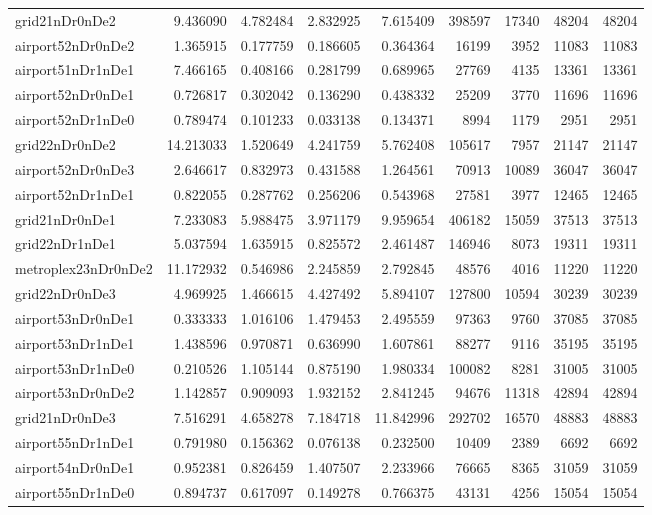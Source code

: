\begin{longtable}{|l|r|r|r|r|r|r|r|r|}
grid21nDr0nDe2 & 9.436090 & 4.782484 & 2.832925 & 7.615409 & 398597 & 17340 & 48204 & 48204 \\
airport52nDr0nDe2 & 1.365915 & 0.177759 & 0.186605 & 0.364364 & 16199 & 3952 & 11083 & 11083 \\
airport51nDr1nDe1 & 7.466165 & 0.408166 & 0.281799 & 0.689965 & 27769 & 4135 & 13361 & 13361 \\
airport52nDr0nDe1 & 0.726817 & 0.302042 & 0.136290 & 0.438332 & 25209 & 3770 & 11696 & 11696 \\
airport52nDr1nDe0 & 0.789474 & 0.101233 & 0.033138 & 0.134371 & 8994 & 1179 & 2951 & 2951 \\
grid22nDr0nDe2 & 14.213033 & 1.520649 & 4.241759 & 5.762408 & 105617 & 7957 & 21147 & 21147 \\
airport52nDr0nDe3 & 2.646617 & 0.832973 & 0.431588 & 1.264561 & 70913 & 10089 & 36047 & 36047 \\
airport52nDr1nDe1 & 0.822055 & 0.287762 & 0.256206 & 0.543968 & 27581 & 3977 & 12465 & 12465 \\
grid21nDr0nDe1 & 7.233083 & 5.988475 & 3.971179 & 9.959654 & 406182 & 15059 & 37513 & 37513 \\
grid22nDr1nDe1 & 5.037594 & 1.635915 & 0.825572 & 2.461487 & 146946 & 8073 & 19311 & 19311 \\
metroplex23nDr0nDe2 & 11.172932 & 0.546986 & 2.245859 & 2.792845 & 48576 & 4016 & 11220 & 11220 \\
grid22nDr0nDe3 & 4.969925 & 1.466615 & 4.427492 & 5.894107 & 127800 & 10594 & 30239 & 30239 \\
airport53nDr0nDe1 & 0.333333 & 1.016106 & 1.479453 & 2.495559 & 97363 & 9760 & 37085 & 37085 \\
airport53nDr1nDe1 & 1.438596 & 0.970871 & 0.636990 & 1.607861 & 88277 & 9116 & 35195 & 35195 \\
airport53nDr1nDe0 & 0.210526 & 1.105144 & 0.875190 & 1.980334 & 100082 & 8281 & 31005 & 31005 \\
airport53nDr0nDe2 & 1.142857 & 0.909093 & 1.932152 & 2.841245 & 94676 & 11318 & 42894 & 42894 \\
grid21nDr0nDe3 & 7.516291 & 4.658278 & 7.184718 & 11.842996 & 292702 & 16570 & 48883 & 48883 \\
airport55nDr1nDe1 & 0.791980 & 0.156362 & 0.076138 & 0.232500 & 10409 & 2389 & 6692 & 6692 \\
airport54nDr0nDe1 & 0.952381 & 0.826459 & 1.407507 & 2.233966 & 76665 & 8365 & 31059 & 31059 \\
airport55nDr1nDe0 & 0.894737 & 0.617097 & 0.149278 & 0.766375 & 43131 & 4256 & 15054 & 15054 \\

\end{longtable}
